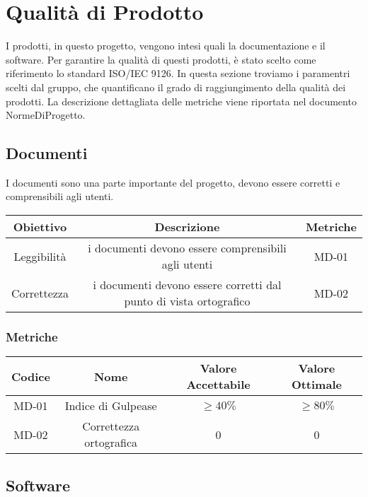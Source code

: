 \section{Qualità di Prodotto}
I prodotti, in questo progetto, vengono intesi quali la documentazione e il software. Per garantire la qualità di questi prodotti, è stato scelto come riferimento lo standard ISO/IEC 9126. In questa sezione troviamo i paramentri scelti dal gruppo, che quantificano il grado di raggiungimento della qualità dei prodotti. La descrizione dettagliata delle metriche viene riportata nel documento NormeDiProgetto.
\subsection{Documenti}
I documenti sono una parte importante del progetto, devono essere corretti e comprensibili agli utenti.
\begin{center}
\renewcommand{\arraystretch}{1.8}
\begin{tabular}{ |c|c|c|}
	\hline
	\textbf{Obiettivo} & \textbf{Descrizione} & \textbf{Metriche} \\
	\hline
	Leggibilità & i documenti devono essere comprensibili agli utenti & MD-01 \\
	\hline
	Correttezza & i documenti devono essere corretti dal punto di vista ortografico & MD-02 \\
	\hline
\end{tabular}
\end{center}
\subsubsection{Metriche}
\begin{center}
\renewcommand{\arraystretch}{1.8}
\begin{tabular}{ |c|c|c|c|}
	\hline
	\textbf{Codice} & \textbf{Nome} & \textbf{Valore Accettabile} & \textbf{Valore Ottimale} \\
	\hline
	MD-01 & Indice di Gulpease &  $\geq 40 \%$ & $\geq 80 \%$ \\
	\hline
	MD-02 & Correttezza ortografica & 0 & 0 \\
	\hline
\end{tabular}
\end{center}
\subsection{Software}